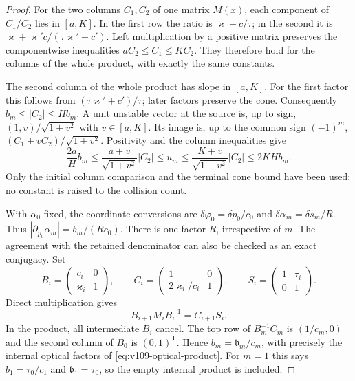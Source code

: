 \begin{proof}
For the two columns $C_1,C_2$ of one matrix $M(x)$, each component
of $C_1/C_2$ lies in $[a,K]$.  In the first row the ratio is
$\varkappa+c/\tau$; in the second it is
$\varkappa+\varkappa'c/(\tau\varkappa'+c')$.
Left multiplication by a positive matrix preserves the
componentwise inequalities $aC_2\le C_1\le KC_2$.
They therefore hold for the columns of the whole product, with
exactly the same constants.

The second column of the whole product has slope in $[a,K]$.
For the first factor this follows from
$(\tau\varkappa'+c')/\tau$; later factors preserve the cone.
Consequently $b_m\le|C_2|\le Hb_m$.  A unit unstable vector at
the source is, up to sign, $(1,v)/\sqrt{1+v^2}$ with
$v\in[a,K]$.  Its image is, up to the common sign $(-1)^m$,
$(C_1+vC_2)/\sqrt{1+v^2}$.  Positivity and the column inequalities
give
\[
 \frac{2a}{H}b_m
 \le\frac{a+v}{\sqrt{1+v^2}}|C_2|
 \le u_m
 \le\frac{K+v}{\sqrt{1+v^2}}|C_2|
 \le2KHb_m.
\]
Only the initial column comparison and the terminal cone bound
have been used; no constant is raised to the collision count.

With $\alpha_0$ fixed, the coordinate conversions are
$\delta\varphi_0=\delta p_0/c_0$ and
$\delta\alpha_m=\delta s_m/R$.  Thus
$|\partial_{p_0}\alpha_m|=b_m/(Rc_0)$.
There is one factor $R$, irrespective of $m$.
The agreement with the retained denominator can also be checked
as an exact conjugacy.  Set
\[
 B_i=\begin{pmatrix}c_i&0\\\varkappa_i&1\end{pmatrix},
 \qquad C_i=\begin{pmatrix}1&0\\2\varkappa_i/c_i&1\end{pmatrix},
 \qquad S_i=\begin{pmatrix}1&\tau_i\\0&1\end{pmatrix}.
\]
Direct multiplication gives
\begin{equation}\label{eq:eo-optical-conjugacy}
                    B_{i+1}M_iB_i^{-1}=C_{i+1}S_i.
\end{equation}
In the product, all intermediate $B_i$ cancel.
The top row of $B_m^{-1}C_m$ is $(1/c_m,0)$ and the second
column of $B_0$ is $(0,1)^{\mathsf T}$.  Hence
$b_m=\mathfrak b_m/c_m$, with precisely the internal optical
factors of \eqref{eq:v109-optical-product}.  For $m=1$ this says
$b_1=\tau_0/c_1$ and $\mathfrak b_1=\tau_0$, so the empty
internal product is included.
\end{proof}

